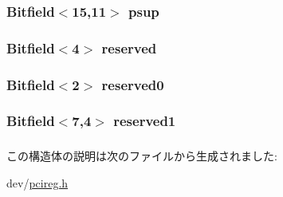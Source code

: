 \hypertarget{structPMCAP_a229da043140a249b194ce5119e274173}{
\subsubsection[{ps}]{}}
\label{structPMCAP_a229da043140a249b194ce5119e274173}
\hypertarget{structPMCAP_af48baa9b38f842caa2a959b61a6639cf}{
\subsubsection[{psup}]{\setlength{\rightskip}{0pt plus 5cm}Bitfield$<$15,11$>$ {\bf psup}}}
\label{structPMCAP_af48baa9b38f842caa2a959b61a6639cf}
\hypertarget{structPMCAP_a0f2c966eea27ed7a9d607165c9726f9f}{
\subsubsection[{reserved}]{\setlength{\rightskip}{0pt plus 5cm}Bitfield$<$4$>$ {\bf reserved}}}
\label{structPMCAP_a0f2c966eea27ed7a9d607165c9726f9f}
\hypertarget{structPMCAP_a3a000414676bb935cf6ecf353ef1895e}{
\subsubsection[{reserved0}]{\setlength{\rightskip}{0pt plus 5cm}Bitfield$<$2$>$ {\bf reserved0}}}
\label{structPMCAP_a3a000414676bb935cf6ecf353ef1895e}
\hypertarget{structPMCAP_ab4c7eb001c06e169dbf1a0ff49da54e8}{
\subsubsection[{reserved1}]{\setlength{\rightskip}{0pt plus 5cm}Bitfield$<$7,4$>$ {\bf reserved1}}}
\label{structPMCAP_ab4c7eb001c06e169dbf1a0ff49da54e8}
\hypertarget{structPMCAP_a618735a7c9209dc2ecdc8a22b793d39a}{
\subsubsection[{vs}]{}}
\label{structPMCAP_a618735a7c9209dc2ecdc8a22b793d39a}


この構造体の説明は次のファイルから生成されました:\begin{DoxyCompactItemize}
\item 
dev/\hyperlink{pcireg_8h}{pcireg.h}\end{DoxyCompactItemize}
